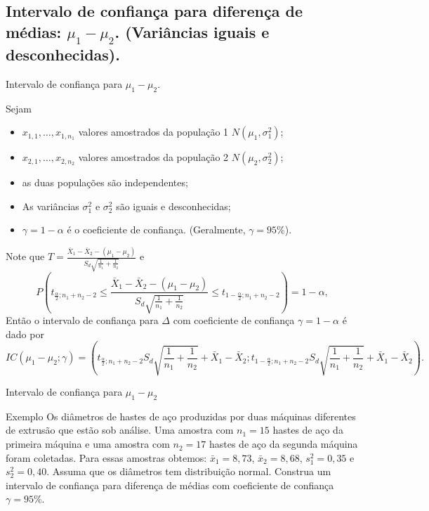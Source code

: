 \documentclass[9pt]{beamer}
\begin{document}
\subsection{Intervalo de confiança para diferença de médias: $\mu_1 - \mu_2$. (Variâncias iguais e desconhecidas).}

\begin{frame}{Intervalo de confiança para $\mu_1 - \mu_2$.}

\normalsize

Sejam
\begin{itemize}
	\item $x_{1,1}, \dots, x_{1,n_1}$ valores amostrados da população 1 $N(\mu_1, \sigma_1^2)$;
	\item $x_{2,1}, \dots, x_{2,n_2}$ valores amostrados da população 2 $N(\mu_2, \sigma_2^2)$;
	\item as duas populações são independentes;
	\item As variâncias $\sigma_1^2$ e $\sigma_2^2$ são iguais e desconhecidas; 
	\item $\gamma=1-\alpha$ é o coeficiente de confiança. (Geralmente, $\gamma=95\%$).
\end{itemize}

Note que $T = \frac{\bar{X}_1  - \bar{X}_2 -(\mu_1 - \mu_2) }{S_d\sqrt{\frac{1}{n_1} + \frac{1}{n_2}}}$ e 
$$P\left( t_{\frac{\alpha}{2}; n_1+n_2-2} \leq \frac{\bar{X}_1  - \bar{X}_2 -(\mu_1 - \mu_2) }{S_d\sqrt{\frac{1}{n_1} + \frac{1}{n_2}}} \leq t_{1-\frac{\alpha}{2}; n_1+n_2-2} \right) = 1 - \alpha,$$
Então o intervalo de confiança para $\Delta$ com coeficiente de confiança $\gamma=1-\alpha$ é dado por
{\scriptsize
	$$IC\left(\mu_1 - \mu_2; \gamma\right) = \left( t_{\frac{\alpha}{2}; n_1+n_2-2} S_d \sqrt{\frac{1}{n_1} + \frac{1}{n_2}} + \bar{X}_1 - \bar{X}_2; t_{1-\frac{\alpha}{2}; n_1+n_2-2} S_d \sqrt{\frac{1}{n_1} + \frac{1}{n_2}} + \bar{X}_1 - \bar{X}_2 \right).$$
}

\normalsize
\end{frame}




\begin{frame}{Intervalo de confiança para $\mu_1 - \mu_2$}

\large
\begin{block}{Exemplo}
	Os diâmetros de hastes de aço produzidas por duas máquinas diferentes de extrusão que estão sob análise. Uma amostra com $n_1 = 15$ hastes de aço da primeira máquina e uma amostra com $n_2=17$ hastes de aço da segunda máquina foram coletadas. Para essas amostras obtemos: $\bar{x}_1=8,73$, $\bar{x}_2=8,68$, $s_1^2=0,35$  e $s_2^2=0,40$. Assuma que os diâmetros tem distribuição normal. Construa um intervalo de confiança para diferença de médias com coeficiente de confiança $\gamma=95\%$.  
\end{block}
\normalsize

\end{frame}
\end{document}
